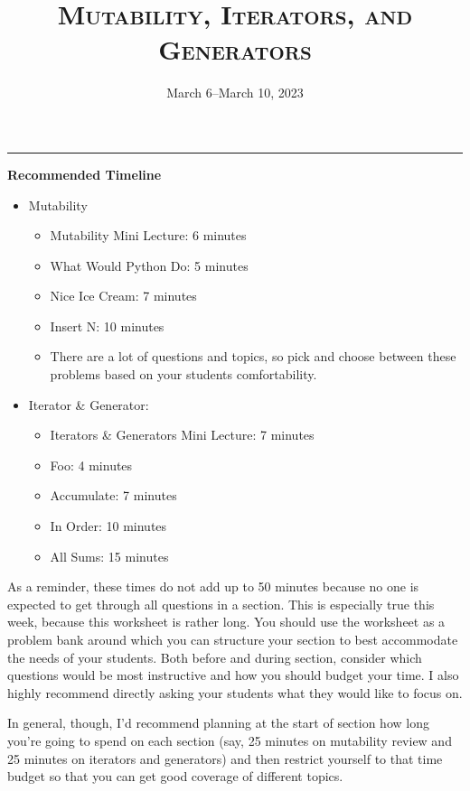 \documentclass{exam}
\title{\textsc{Mutability, Iterators, and Generators}}
\date{March 6--March 10, 2023}
\begin{document}
\maketitle
\rule{\textwidth}{0.15em}


\begin{guide}
    \textbf{Recommended Timeline}
    \begin{itemize}
        \item Mutability
        \begin{itemize}
            \item Mutability Mini Lecture: 6 minutes
            \item What Would Python Do: 5 minutes
            \item Nice Ice Cream: 7 minutes
            \item Insert N: 10 minutes
            \item There are a lot of questions and topics, so pick and choose between these problems based on your students comfortability.
        \end{itemize}
        \item Iterator \& Generator:
        \begin{itemize}
            \item Iterators \& Generators Mini Lecture: 7 minutes
            \item Foo: 4 minutes
            \item Accumulate: 7 minutes
            \item In Order: 10 minutes
            \item All Sums: 15 minutes
        \end{itemize}
    \end{itemize}

    As a reminder, these times do not add up to 50 minutes because no one is expected 
    to get through all questions in a section. This is especially true this week, 
    because this worksheet is rather long. You should use the worksheet as a problem bank
     around which you can structure your section to best accommodate the needs of your 
     students. Both before and during section, consider which questions would be most 
     instructive and how you should budget your time. I also highly recommend directly asking your students what they would like to focus on.
     
    In general, though, I'd recommend planning at the start of section how long you're going to 
    spend on each section (say, 25 minutes on mutability review and 25 minutes on iterators and generators)
    and then restrict yourself to that time budget so that you can get good coverage of different topics. 
\end{guide}
\end{document}
